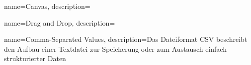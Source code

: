 

 {
	name={Canvas},
	description={}
}

 {
	name={Drag and Drop},
	description={}
}

 {
	name={Comma-Separated Values},
	description={Das Dateiformat CSV beschreibt den Aufbau einer Textdatei zur Speicherung oder zum Austausch einfach strukturierter Daten}
}